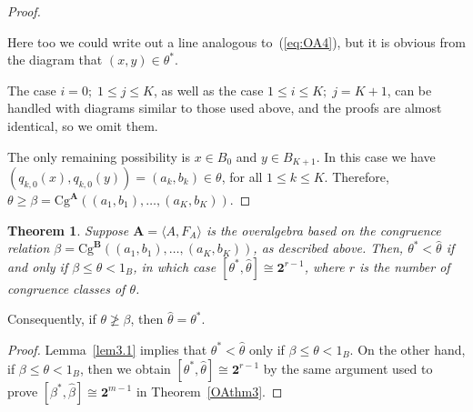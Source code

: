 \documentclass[cm,dissertation]{uhthesis}
\theoremstyle{plain}
\newtheorem{theorem}{Theorem}[section]
\theoremstyle{definition}
\theoremstyle{remark}
\numberwithin{theorem}{section}
\numberwithin{claim}{chapter}
\numberwithin{equation}{section}
\numberwithin{conjecture}{chapter}
\newcommand{\<}{\ensuremath{\langle}}
\renewcommand{\>}{\ensuremath{\rangle}}
\renewcommand{\leq}{\ensuremath{\leqslant}}
\renewcommand{\geq}{\ensuremath{\geqslant}}
\renewcommand{\ngeq}{\ensuremath{\ngeqslant}}
\newcommand{\Cg}{\ensuremath{\mathrm{Cg}}}
\newcommand{\0}{\ensuremath{\mathbf{0}}}
\newcommand{\1}{\ensuremath{\mathbf{1}}}
\newcommand{\2}{\ensuremath{\mathbf{2}}}
\newcommand{\3}{\ensuremath{\mathbf{3}}}
\newcommand{\4}{\ensuremath{\mathbf{4}}}
\newcommand{\5}{\ensuremath{\mathbf{5}}}
\newcommand{\bA}{\ensuremath{\mathbf{A}}}
\newcommand{\bB}{\ensuremath{\mathbf{B}}}
\newcommand{\two}{\ensuremath{\mathbf{2}}}
\begin{document}
\begin{proof}
\begin{center}
  \end{center}
  Here too we could write out a line analogous to~(\ref{eq:OA4}), but it is
  obvious from the diagram that $(x,y)\in \theta^*$.

  The case $i=0;\; 1 \leq j \leq K$, as well as the case
  $1 \leq i \leq K;\; j = K+1$,
  can be handled with diagrams similar to
  those used above, and the proofs are almost identical, so we omit them.


  The only remaining possibility is $x\in B_0$ and $y\in B_{K+1}$.  In this case
  we have 
  $(q_{k,0}(x),q_{k,0}(y)) = (a_k, b_k) \in \theta$,
  for all $1\leq k \leq K$.
  Therefore, $\theta \geq \beta = \Cg^{\bA}((a_1, b_1), \dots, (a_K, b_K))$.
\end{proof}

\begin{theorem}
  \label{OAthm4}
  Suppose $\bA = \< A, F_A\>$ is the overalgebra
  based on the congruence relation $\beta = \Cg^{\bB}((a_1, b_1), \dots,
  (a_K,b_K))$, as described above. Then,
  $\theta^* < \widehat{\theta}$ if and only if
  $\beta\leq \theta < 1_B$, in which case $[\theta^*, \widehat{\theta}] \cong \two^{r-1}$, where $r$
  is the number of congruence classes of $\theta$. 
\end{theorem}
Consequently, if $\theta \ngeq \beta$, then $\widehat{\theta} = \theta^*$.
\begin{proof}
  Lemma~\ref{lem3.1} implies that $\theta^* < \widehat{\theta}$ only if
  $\beta\leq \theta < 1_B$. On the other hand,  
  if $\beta\leq \theta < 1_B$, then we obtain
  $[\theta^*, \widehat{\theta}] \cong \two^{r-1}$ 
  by the same argument used to prove
  $[\beta^*, \widehat{\beta}] \cong \two^{m-1}$ in 
  Theorem~\ref{OAthm3}.  %
\end{proof}
\end{document}
